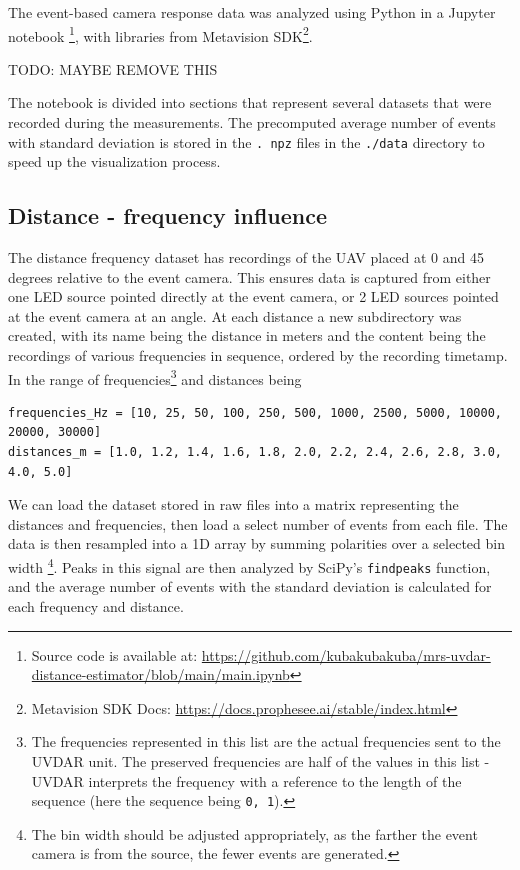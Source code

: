 The event-based camera response data was analyzed using Python in a Jupyter notebook
\footnote{Source code is available at: \url{https://github.com/kubakubakuba/mrs-uvdar-distance-estimator/blob/main/main.ipynb}},
with libraries from Metavision SDK\footnote{Metavision SDK Docs: \url{https://docs.prophesee.ai/stable/index.html}}.

TODO: MAYBE REMOVE THIS

The notebook is divided into sections that represent several datasets that were recorded during the measurements.
The precomputed average number of events with standard deviation is stored in the \texttt{. npz} files in the \texttt{./data} directory to speed up the visualization process.

\subsection{Distance - frequency influence}

The distance frequency dataset has recordings of the UAV placed at 0 and 45 degrees relative to the event camera. This ensures data is captured from either
one LED source pointed directly at the event camera, or 2 LED sources pointed at the event camera at an angle. At each distance a new subdirectory was
created, with its name being the distance in meters and the content being the recordings of various frequencies in sequence, ordered by the recording timetamp.
In the range of frequencies\footnote{The frequencies represented in this list are the actual frequencies sent to the UVDAR unit. The preserved frequencies
are half of the values in this list - UVDAR interprets the frequency with a reference to the length of the sequence (here the sequence being \texttt{0, 1}).} and distances being
\begin{lstlisting}
frequencies_Hz = [10, 25, 50, 100, 250, 500, 1000, 2500, 5000, 10000, 20000, 30000]
distances_m = [1.0, 1.2, 1.4, 1.6, 1.8, 2.0, 2.2, 2.4, 2.6, 2.8, 3.0, 4.0, 5.0]
\end{lstlisting}
We can load the dataset stored in raw files into a matrix representing the distances and frequencies, then load a select number of events from each file.
The data is then resampled into a 1D array by summing polarities over a selected bin width
\footnote{The bin width should be adjusted appropriately, as the farther the event camera is from the source, the fewer events are generated.}.
Peaks in this signal are then analyzed by SciPy's \texttt{findpeaks} function,
and the average number of events with the standard deviation is calculated for each frequency and distance.

